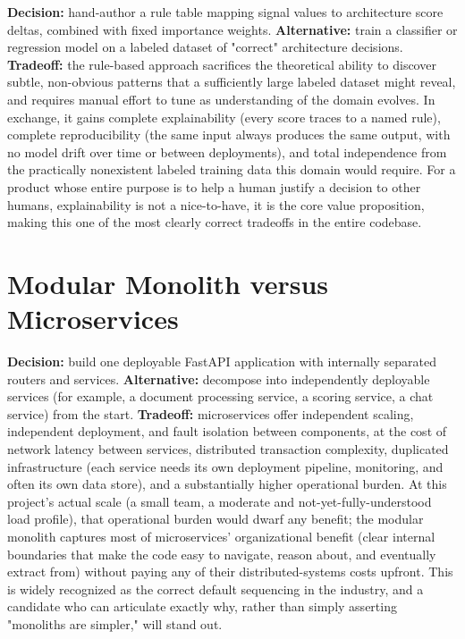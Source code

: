 \documentclass[11pt,a4paper]{report}
\begin{document}
\textbf{Decision:} hand-author a rule table mapping signal values to architecture score deltas, combined with fixed importance weights.
\textbf{Alternative:} train a classifier or regression model on a labeled dataset of "correct" architecture decisions.
\textbf{Tradeoff:} the rule-based approach sacrifices the theoretical ability to discover subtle, non-obvious patterns that a sufficiently large labeled dataset might reveal, and requires manual effort to tune as understanding of the domain evolves. In exchange, it gains complete explainability (every score traces to a named rule), complete reproducibility (the same input always produces the same output, with no model drift over time or between deployments), and total independence from the practically nonexistent labeled training data this domain would require. For a product whose entire purpose is to help a human justify a decision to other humans, explainability is not a nice-to-have, it is the core value proposition, making this one of the most clearly correct tradeoffs in the entire codebase.

\section{Modular Monolith versus Microservices}

\textbf{Decision:} build one deployable FastAPI application with internally separated routers and services.
\textbf{Alternative:} decompose into independently deployable services (for example, a document processing service, a scoring service, a chat service) from the start.
\textbf{Tradeoff:} microservices offer independent scaling, independent deployment, and fault isolation between components, at the cost of network latency between services, distributed transaction complexity, duplicated infrastructure (each service needs its own deployment pipeline, monitoring, and often its own data store), and a substantially higher operational burden. At this project's actual scale (a small team, a moderate and not-yet-fully-understood load profile), that operational burden would dwarf any benefit; the modular monolith captures most of microservices' organizational benefit (clear internal boundaries that make the code easy to navigate, reason about, and eventually extract from) without paying any of their distributed-systems costs upfront. This is widely recognized as the correct default sequencing in the industry, and a candidate who can articulate exactly why, rather than simply asserting "monoliths are simpler," will stand out.
\end{document}
